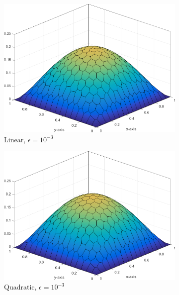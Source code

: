 \begin{figure}
{	\begin{subfigure}[b]{0.465\textwidth}
		\centering
		\label{subfig::DL_trans_pwl1_e3}
		\includegraphics[width=\textwidth]{figures/sec_BF/Sq_poly_PWLD_k=1_ep=1e-3.png}
		\caption{Linear, $\epsilon = 10^{-3}$}
	\end{subfigure}
	\hfill
	\begin{subfigure}[b]{0.465\textwidth}
		\centering
		\label{subfig::DL_trans_pwl2_e3}
		\includegraphics[width=\textwidth]{figures/sec_BF/Sq_poly_PWLD_k=2_ep=1e-3.png}
		\caption{Quadratic, $\epsilon = 10^{-3}$}
	\end{subfigure}
}
{
	\vspace{3mm}
	\begin{subfigure}[b]{0.465\textwidth}

\end{subfigure}}
\end{figure}
